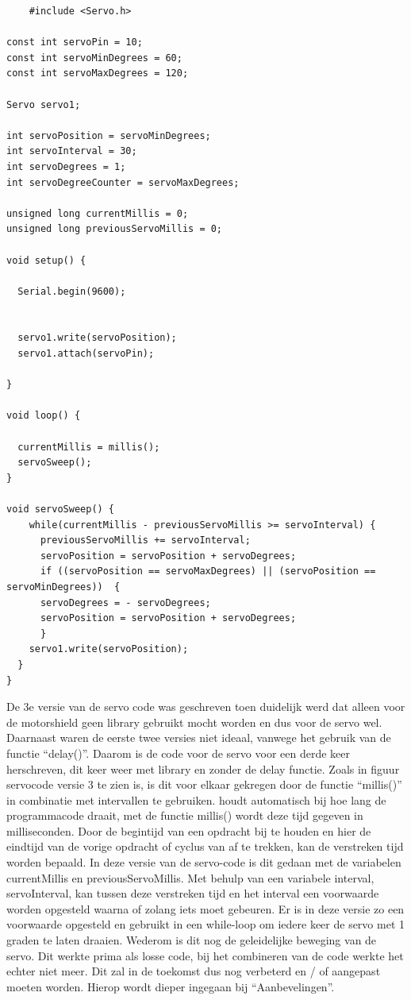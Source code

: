 \begin{lstlisting}
    #include <Servo.h>

const int servoPin = 10; 
const int servoMinDegrees = 60; 
const int servoMaxDegrees = 120;

Servo servo1;

int servoPosition = servoMinDegrees;    
int servoInterval = 30; 
int servoDegrees = 1;       
int servoDegreeCounter = servoMaxDegrees;

unsigned long currentMillis = 0;    
unsigned long previousServoMillis = 0; 

void setup() {

  Serial.begin(9600);
  
  
  servo1.write(servoPosition); 
  servo1.attach(servoPin);
 
}

void loop() {

  currentMillis = millis();
  servoSweep();
}

void servoSweep() {
    while(currentMillis - previousServoMillis >= servoInterval) {
      previousServoMillis += servoInterval;
      servoPosition = servoPosition + servoDegrees; 
      if ((servoPosition == servoMaxDegrees) || (servoPosition == servoMinDegrees))  {
      servoDegrees = - servoDegrees; 
      servoPosition = servoPosition + servoDegrees; 
      }  
    servo1.write(servoPosition);
  }
}
\end{lstlisting}

De 3e versie van de servo code was geschreven toen duidelijk werd dat alleen voor de motorshield geen library gebruikt mocht worden en dus voor de servo wel. Daarnaast waren de eerste twee versies niet ideaal, vanwege het gebruik van de functie “delay()”. Daarom is de code voor de servo voor een derde keer herschreven, dit keer weer met library en zonder de delay functie\cite{Functie-millis-info}. 
Zoals in figuur servocode versie 3 te zien is, is dit voor elkaar gekregen door de functie “millis()” in combinatie met intervallen te gebruiken. \cite{ArduinoMEGA} houdt automatisch bij hoe lang de programmacode draait, met de functie millis() wordt deze tijd gegeven in milliseconden. Door de begintijd van een opdracht bij te houden en hier de eindtijd van de vorige opdracht of cyclus van af te trekken, kan de verstreken tijd worden bepaald. In deze versie van de servo-code is dit gedaan met de variabelen 
currentMillis en previousServoMillis. Met behulp van een variabele interval, servoInterval, kan tussen deze verstreken tijd en het interval een voorwaarde worden opgesteld waarna of zolang iets moet gebeuren. Er is in deze versie zo een voorwaarde opgesteld en gebruikt in een while-loop om iedere keer de servo met 1 graden te laten draaien. Wederom is dit nog de geleidelijke beweging van de servo.
Dit werkte prima als losse code, bij het combineren van de code werkte het echter niet meer. Dit zal in de toekomst dus nog verbeterd en / of aangepast moeten worden. Hierop wordt dieper ingegaan bij “Aanbevelingen”.


